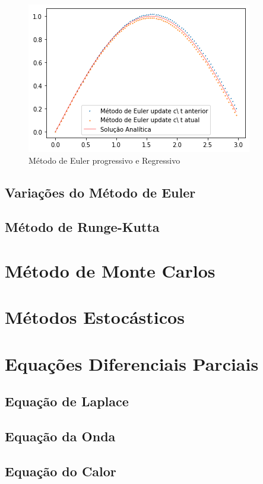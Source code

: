 \begin{figure}
    \centering
    \includegraphics{Images/euler2.png}
    \caption{Método de Euler progressivo e Regressivo}
    \label{fig:euler2}
\end{figure}

\subsection{Variações do Método de Euler}
\subsection{Método de Runge-Kutta}
\section{Método de Monte Carlos}\label{sc:Monte_Carlo}
\section{Métodos Estocásticos}
\section{Equações Diferenciais Parciais}
\subsection{Equação de Laplace}
\subsection{Equação da Onda}
\subsection{Equação do Calor}
